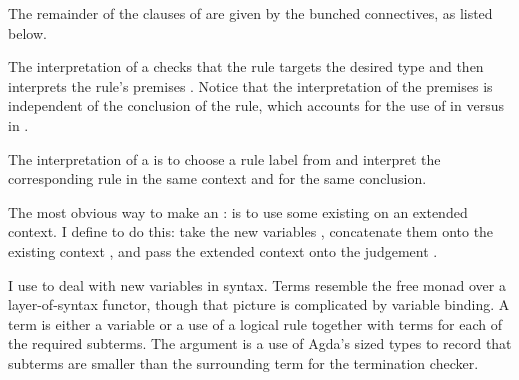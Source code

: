 The remainder of the clauses of 
are given by the bunched connectives, as listed below.


The interpretation of a  checks that the rule targets
the desired type and then interprets the rule's premises
.  Notice that the interpretation of the premises is
independent of the conclusion of the rule, which accounts for the use
of  in
 versus
 in .


The interpretation of a  is to choose a rule label
 from  and interpret the corresponding rule
\AgdaSpace{} in the same context and for the same
conclusion.


The most obvious way to make an
\AgdaSpace{}\AgdaSymbol:\AgdaSpace{}%
\AgdaSpace{}\AgdaSymbol{\_}
is to use some existing
 on an extended context.
I define  to do this: take the new variables
\AgdaBound{$\Delta$}, concatenate them onto the existing context
\AgdaBound{$\Gamma$}, and pass the extended context onto the judgement
.



I use  to deal with new variables in syntax.
Terms resemble the free monad over a layer-of-syntax functor, though
that picture is complicated by variable binding.  A term is either a
variable or a use of a logical rule together with terms for each of
the required subterms.
The  argument  is a use of
Agda's sized types to record that subterms are smaller than the
surrounding term for the termination checker.



